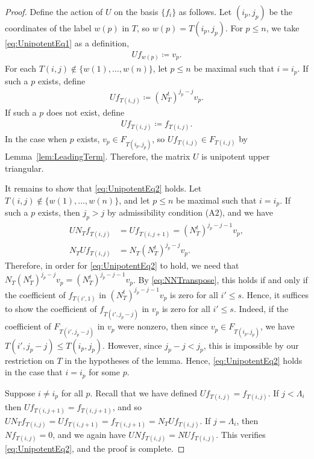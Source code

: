 \documentclass[12pt]{amsart}
\begin{document}
\begin{proof}
Define the action of $U$ on the basis $\{f_{i}\}$ as follows. Let $(i_p,j_p)$ be the coordinates of the label $w(p)$ in $T$, so $w(p)=T(i_p,j_p)$. For $p\leq n$, we take \eqref{eq:UnipotentEq1} as a definition,
\begin{align}\label{eq:FirstUDef}
U f_{w(p)} \coloneqq v_p.
\end{align}
For each $T(i,j) \notin\{w(1),\dots, w(n)\}$, let $p\leq n$ be maximal such that $i = i_p$. If such a $p$ exists, define
\begin{align}
U f_{T(i,j)} \coloneqq (N_T^t)^{j_p-j} v_p.
\end{align}
If such a $p$ does not exist, define
\begin{align}
Uf_{T(i,j)} \coloneqq f_{T(i,j)}.
\end{align}
In the case when $p$ exists, $v_p\in F_{T(i_p,j_p)}$, so  $Uf_{T(i,j)}\in F_{T(i,j)}$ by Lemma~\ref{lem:LeadingTerm}. Therefore, the matrix $U$ is unipotent upper triangular.

It remains to show that \eqref{eq:UnipotentEq2} holds. Let $T(i,j)\notin \{w(1),\dots, w(n)\}$, and let $p\leq n$ be maximal such that $i=i_p$. If such a $p$ exists, then $j_p > j$ by admissibility condition (A2), and we have
\begin{align}
UN_T f_{T(i,j)} &= Uf_{T(i,j+1)} = (N_T^t)^{j_p-j-1}v_p,\\
N_TU f_{T(i,j)} &= N_T(N_T^t)^{j_p-j}v_p.
\end{align}
Therefore, in order for \eqref{eq:UnipotentEq2} to hold, we need that $N_T(N_T^t)^{j_p-j}v_p = (N_T^t)^{j_p-j-1} v_p$. By \eqref{eq:NNTranspose}, this holds if and only if the coefficient of $f_{T(i',1)}$ in $(N_T^t)^{j_p-j-1}v_p$ is zero for all $i'\leq s$. Hence, it suffices to show the coefficient of $f_{T(i',j_p-j)}$ in $v_p$ is zero for all $i'\leq s$. Indeed, if the coefficient of $F_{T(i',j_p-j)}$ in $v_p$ were nonzero, then since $v_p\in F_{T(i_p,j_p)}$, we have $T(i',j_p-j) \leq T(i_p,j_p)$. However, since $j_p-j<j_p$, this is impossible by our restriction on $T$ in the hypotheses of the lemma. Hence,  \eqref{eq:UnipotentEq2} holds in the case that $i = i_p$ for some $p$.

Suppose $i\neq i_p$ for all $p$. Recall that we have defined $Uf_{T(i,j)} = f_{T(i,j)}$. If $j<\Lambda_i$ then $Uf_{T(i,j+1)} = f_{T(i,j+1)}$, and so $UN_T f_{T(i,j)} = Uf_{T(i,j+1)} = f_{T(i,j+1)} = N_TUf_{T(i,j)}$. If $j=\Lambda_i$, then $Nf_{T(i,j)} = 0$, and we again have $UNf_{T(i,j)} = NUf_{T(i,j)}$. This verifies \eqref{eq:UnipotentEq2}, and the proof is complete.
\end{proof}
\end{document}
